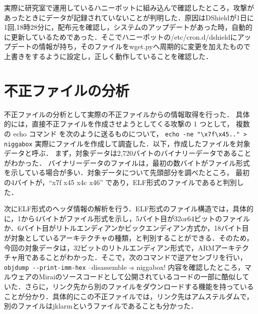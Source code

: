 \documentclass[dvipdfmx]{bta}
\begin{document}
実際に研究室で運用しているハニーポットに組み込んで確認したところ，攻撃があったときにデータが記録されていないことが判明した．原因はDShieldが1日に1回,18時28分に，配布元を確認し，システムのアップデートがあった時，自動的に更新しているためであった．そこでハニーポットの/etc/cron.d/dshieldにアップデートの情報が持ち，そのファイルをwget.pyへ周期的に変更を加えたもので上書きをするように設定し，正しく動作していることを確認した．

\chapter{不正ファイルの分析}
不正ファイルの分析として実際の不正ファイルからの情報取得を行った．
具体的には，直接不正ファイルを作成させようとしてくる攻撃の 1 つとして，
複数の echo コマンド を次のように送るものについて，
\verb!echo -ne "\x7f\x45.." > niggabox!
実際にファイルを作成して調査した．以下，作成したファイルを対象データと呼ぶ． 
まず，対象データは2,720バイトのバイナリーデータであることがわかった．
バイナリーデータのファイルは，最初の数バイトがファイル形式を示している場合が多い．対象データについて先頭部分を調べたところ，
最初の4バイトが，“x7f x45 x4c x46” であり，ELF形式\cite{elf}のファイルであると判別した．

次にELF形式のヘッダ情報の解析を行う．ELF形式のファイル構造では，具体的に，1から4バイトがファイル形式を示し，5バイト目が32or64ビットのファイルか．6バイト目がリトルエンディアンかビックエンディアン方式か，18バイト目が対象としているアーキテクチャの種類，と判別することができる．そのため，今回の対象データは，32ビットのリトルエンディアン形式で，ARMアーキテクチャ用であることがわかった．そこで，次のコマンドで逆アセンブリを行い，
\verb!objdump --print-imm-hex!
--disassemble -s niggabox!
内容を確認したところ，マルウェアのMiraiのソースコード\cite{Mirai}として公開されているコードの一部に酷似していた．さらに，リンク先から別のファイルをダウンロードする機能を持っていることが分かり．具体的にこの不正ファイルでは，リンク先はアムステルダムで，別のファイルはjklarmというファイルであることも分かった．


\end{document}
